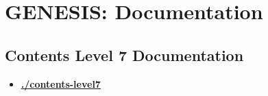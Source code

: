 \documentclass[12pt]{article}
\begin{document}
\section*{GENESIS: Documentation}

\subsection*{Contents Level 7 Documentation}

\begin{itemize}

\item \href{.././contents-level7/./contents-level7.pdf}{\bf \underline{./contents-level7}}


\end{itemize}

\end{document}
